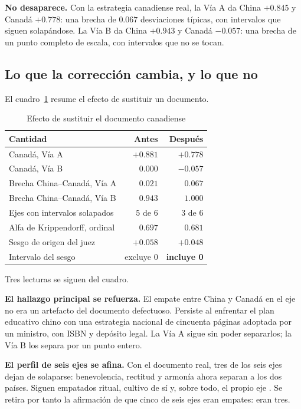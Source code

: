 \textbf{No desaparece.} Con la estrategia canadiense real, la Vía A da China $+0.845$ y Canadá $+0.778$: una brecha de $0.067$ desviaciones típicas, con intervalos que siguen solapándose. La Vía B da China $+0.943$ y Canadá $-0.057$: una brecha de un punto completo de escala, con intervalos que no se tocan.

\subsection{Lo que la corrección cambia, y lo que no}

El cuadro~\ref{tab:antes-despues} resume el efecto de sustituir un documento.

\begin{table}[htbp]
\centering
\caption{Efecto de sustituir el documento canadiense}
\label{tab:antes-despues}
\begin{tabular}{lrr}
\hline
\textbf{Cantidad} & \textbf{Antes} & \textbf{Después} \\
\hline
Canadá, Vía A & $+0.881$ & $+0.778$ \\
Canadá, Vía B & $\phantom{+}0.000$ & $-0.057$ \\
Brecha China--Canadá, Vía A & $0.021$ & $0.067$ \\
Brecha China--Canadá, Vía B & $0.943$ & $1.000$ \\
Ejes con intervalos solapados & 5 de 6 & 3 de 6 \\
Alfa de Krippendorff, ordinal & $0.697$ & $0.681$ \\
Sesgo de origen del juez & $+0.058$ & $+0.048$ \\
Intervalo del sesgo & excluye 0 & \textbf{incluye 0} \\
\hline
\end{tabular}
\end{table}

Tres lecturas se siguen del cuadro.

\textbf{El hallazgo principal se refuerza.} El empate entre China y Canadá en el eje \dezhi{} no era un artefacto del documento defectuoso. Persiste al enfrentar el plan educativo chino con una estrategia nacional de cincuenta páginas adoptada por un ministro, con ISBN y depósito legal. La Vía A sigue sin poder separarlos; la Vía B los separa por un punto entero.

\textbf{El perfil de seis ejes se afina.} Con el documento real, tres de los seis ejes dejan de solaparse: benevolencia, rectitud y armonía ahora separan a los dos países. Siguen empatados ritual, cultivo de sí y, sobre todo, el propio eje \dezhi. Se retira por tanto la afirmación de que cinco de seis ejes eran empates: eran tres.

